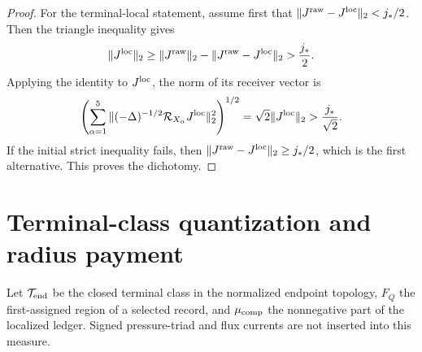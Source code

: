 \documentclass[11pt]{article}
\theoremstyle{definition}\newtheorem{problem}[theorem]{Problem}
\theoremstyle{definition}
\theoremstyle{remark}
\begin{document}
\begin{proof}
For the terminal-local statement, assume first that
\(\|J^{\rm raw}-J^{\rm loc}\|_2<j_*/2\).  Then the triangle inequality gives
\[
 \|J^{\rm loc}\|_2
 \ge\|J^{\rm raw}\|_2-
     \|J^{\rm raw}-J^{\rm loc}\|_2
 >\frac{j_*}{2}.
\]
Applying the identity to \(J^{\rm loc}\), the norm of its receiver vector is
\[
 \left(
 \sum_{\alpha=1}^5
 \|(-\Delta)^{-1/2}\mathcal R_{X_\alpha}J^{\rm loc}\|_2^2
 \right)^{1/2}
 =\sqrt2\|J^{\rm loc}\|_2
 >\frac{j_*}{\sqrt2}.
\]
If the initial strict inequality fails, then
\(\|J^{\rm raw}-J^{\rm loc}\|_2\ge j_*/2\), which is the first alternative.
This proves the dichotomy.
\end{proof}

\section{Terminal-class quantization and radius payment}
\label{sec:radius-payment}
Let $\mathcal T_{\rm end}$ be the closed terminal class in the normalized endpoint topology, $F_Q$ the first-assigned region of a selected record, and $\mu_{\rm comp}$ the nonnegative part of the localized ledger.  Signed pressure-triad and flux currents are not inserted into this measure.
\end{document}
